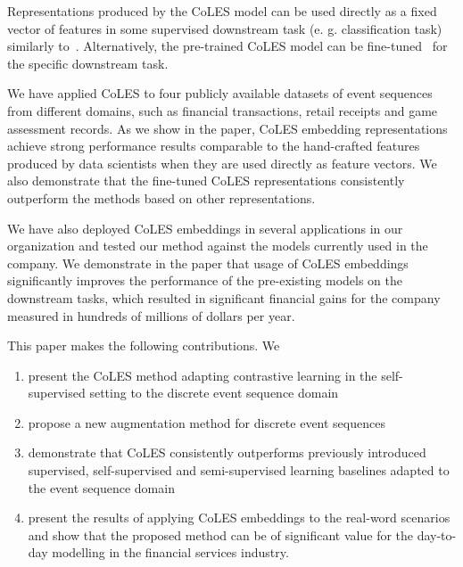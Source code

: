 \documentclass[sigconf, anonymous]{acmart}
\begin{document}
Representations produced by the CoLES model can be used directly as a fixed vector of features in some supervised downstream task (e. g. classification task) similarly to~\citep{Mikolov2013EfficientEO, Song2017LearningUE, Zhai2019LearningAU}. Alternatively, the pre-trained CoLES model can be fine-tuned~\citep{Yosinski2014HowTA} for the specific downstream task.

We have applied CoLES to four publicly available datasets of event sequences from different domains, such as financial transactions, retail receipts and game assessment records. As we show in the paper, CoLES embedding representations achieve strong performance results comparable to the hand-crafted features produced by data scientists when they are used directly as feature vectors.
We also demonstrate that the fine-tuned CoLES representations consistently outperform the methods based on other representations. %

We have also deployed CoLES embeddings 
in several applications in our organization 
and tested our method against the models currently used in the company. 
We demonstrate in the paper that usage of CoLES embeddings significantly improves the performance of the pre-existing models on the downstream tasks, which resulted in significant financial gains for the company measured in hundreds of millions of dollars per year.


This paper makes the following contributions. We
\begin{enumerate}

\item present the CoLES method adapting contrastive learning in the self-supervised setting to the discrete event sequence domain

\item propose a new
augmentation method for discrete event sequences
\item demonstrate that CoLES consistently outperforms previously introduced supervised, self-supervised and semi-supervised learning baselines adapted to the event sequence domain

\item present the results of applying CoLES embeddings to the real-word scenarios and show that the proposed method can be of significant value for the day-to-day modelling in the financial services industry.
\end{enumerate}
\end{document}
